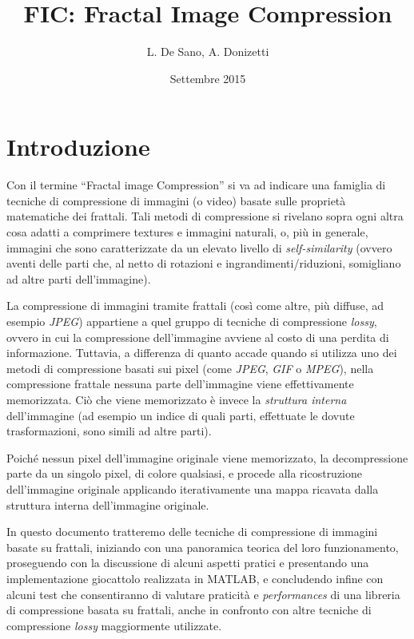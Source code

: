 \documentclass[11pt,a4paper,appendixprefix=true,numbers=noenddot]{scrreprt}
\author{L. De Sano, A. Donizetti}
\title{\textsc{FIC}: Fractal Image Compression}
\date{Settembre 2015}
\begin{document}
\maketitle

\tableofcontents

\chapter{Introduzione}

Con il termine ``Fractal image Compression'' si va ad indicare una famiglia di tecniche di compressione di immagini (o video) basate sulle proprietà matematiche dei frattali. Tali metodi di compressione si rivelano sopra ogni altra cosa adatti a comprimere textures e immagini naturali, o, più in generale, immagini che sono caratterizzate da un elevato livello di \emph{self-similarity} (ovvero aventi delle parti che, al netto di rotazioni e ingrandimenti/riduzioni, somigliano ad altre parti dell'immagine).

La compressione di immagini tramite frattali (così come altre, più diffuse, ad esempio \textit{JPEG}) appartiene a quel gruppo di tecniche di compressione \emph{lossy}, ovvero in cui la compressione dell'immagine avviene al costo di una perdita di informazione. Tuttavia, a differenza di quanto accade quando si utilizza uno dei metodi di compressione basati sui pixel (come \textit{JPEG}, \textit{GIF} o \textit{MPEG}), nella compressione frattale nessuna parte dell'immagine viene effettivamente memorizzata. Ciò che viene memorizzato è invece la \emph{struttura interna} dell'immagine (ad esempio un indice di quali parti, effettuate le dovute trasformazioni, sono simili ad altre parti). 

Poiché nessun pixel dell'immagine originale viene memorizzato, la decompressione parte da un singolo pixel, di colore qualsiasi, e procede alla ricostruzione dell'immagine originale applicando iterativamente una mappa ricavata dalla struttura interna dell'immagine originale.

In questo documento tratteremo delle tecniche di compressione di immagini basate su frattali, iniziando con una panoramica teorica del loro funzionamento, proseguendo con la discussione di alcuni aspetti pratici e presentando una implementazione giocattolo realizzata in MATLAB, e concludendo infine con alcuni test che consentiranno di valutare praticità e \emph{performances} di una libreria di compressione basata su frattali, anche in confronto con altre tecniche di compressione \emph{lossy} maggiormente utilizzate.
\end{document}
